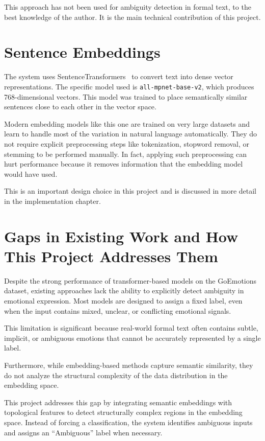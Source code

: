 This approach has not been used for ambiguity detection in formal text, to the best
knowledge of the author. It is the main technical contribution of this project.

\section{Sentence Embeddings}

The system uses SentenceTransformers~\cite{sentence_bert} to convert text into dense vector representations.
The specific model used is \texttt{all-mpnet-base-v2}, which produces 768-dimensional vectors.
This model was trained to place semantically similar sentences close to each other in the vector
space.

Modern embedding models like this one are trained on very large datasets and learn to handle
most of the variation in natural language automatically. They do not require explicit
preprocessing steps like tokenization, stopword removal, or stemming to be performed manually.
In fact, applying such preprocessing can hurt performance because it removes information that
the embedding model would have used.

This is an important design choice in this project and is discussed in more detail in the
implementation chapter.

\section{Gaps in Existing Work and How This Project Addresses Them}

Despite the strong performance of transformer-based models on the GoEmotions dataset, existing approaches lack the ability to explicitly detect ambiguity in emotional expression. Most models are designed to assign a fixed label, even when the input contains mixed, unclear, or conflicting emotional signals.

This limitation is significant because real-world formal text often contains subtle, implicit, or ambiguous emotions that cannot be accurately represented by a single label.

Furthermore, while embedding-based methods capture semantic similarity, they do not analyze the structural complexity of the data distribution in the embedding space.

This project addresses this gap by integrating semantic embeddings with topological features to detect structurally complex regions in the embedding space. Instead of forcing a classification, the system identifies ambiguous inputs and assigns an ``Ambiguous'' label when necessary.
